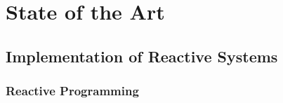 \chapter{State of the Art} \label{chap:State of the Art}

\section{Implementation of Reactive Systems}
	\subsection{Reactive Programming}

